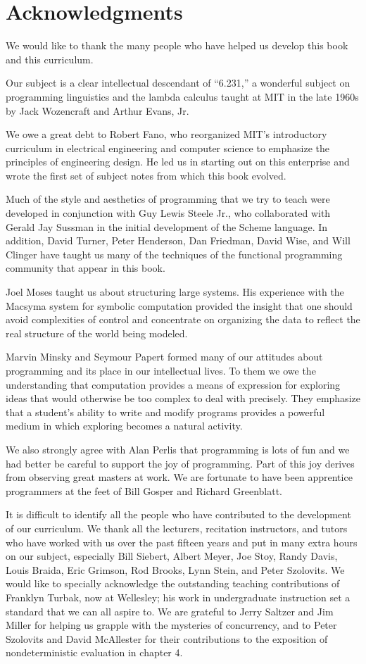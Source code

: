 \chapter{Acknowledgments}
We would like to thank the many people who have helped us develop this
book and this curriculum.

Our subject is a clear intellectual descendant of ``6.231,'' a
wonderful subject on programming linguistics and the lambda calculus
taught at MIT in the late 1960s by Jack Wozencraft and Arthur Evans,
Jr.

We owe a great debt to Robert Fano, who reorganized MIT's introductory
curriculum in electrical engineering and computer science to emphasize
the principles of engineering design.  He led us in starting out on
this enterprise and wrote the first set of subject notes from which
this book evolved.

Much of the style and aesthetics of programming that we try to teach
were developed in conjunction with Guy Lewis Steele Jr., who
collaborated with Gerald Jay Sussman in the initial development of the
Scheme language.  In addition, David Turner, Peter Henderson, Dan
Friedman, David Wise, and Will Clinger have taught us many of the
techniques of the functional programming community that appear in this
book.

Joel Moses taught us about structuring large systems.  His experience
with the Macsyma system for symbolic computation provided the insight
that one should avoid complexities of control and concentrate on
organizing the data to reflect the real structure of the world being
modeled.

Marvin Minsky and Seymour Papert formed many of our attitudes about
programming and its place in our intellectual lives.  To them we owe
the understanding that computation provides a means of expression for
exploring ideas that would otherwise be too complex to deal with
precisely.  They emphasize that a student's ability to write and
modify programs provides a powerful medium in which exploring becomes
a natural activity.

We also strongly agree with Alan Perlis that programming is lots of
fun and we had better be careful to support the joy of programming.
Part of this joy derives from observing great masters at work.  We are
fortunate to have been apprentice programmers at the feet of Bill
Gosper and Richard Greenblatt.

It is difficult to identify all the people who have contributed to the
development of our curriculum.  We thank all the lecturers, recitation
instructors, and tutors who have worked with us over the past fifteen
years and put in many extra hours on our subject, especially Bill
Siebert, Albert Meyer, Joe Stoy, Randy Davis, Louis Braida, Eric
Grimson, Rod Brooks, Lynn Stein, and Peter Szolovits.
We would like to specially acknowledge the outstanding teaching
contributions of Franklyn Turbak, now at Wellesley; his work
in undergraduate instruction set a standard that we can
all aspire to.
We are grateful to Jerry Saltzer and Jim Miller for
helping us grapple with the mysteries of concurrency, and to
Peter Szolovits and David McAllester for their contributions
to the exposition of nondeterministic evaluation in chapter 4.

